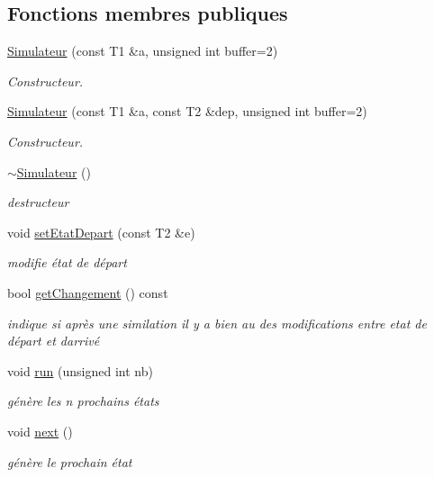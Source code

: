 \subsection*{Fonctions membres publiques}
\begin{DoxyCompactItemize}
\item 
\hyperlink{class_simulateur_afbd90fb92cd6e29e7a2ffe222d0194f8}{Simulateur} (const T1 \&a, unsigned int buffer=2)
\begin{DoxyCompactList}\small\item\em Constructeur. \end{DoxyCompactList}\item 
\hyperlink{class_simulateur_a9c6136e1ffa9ff733ab6b6680a556535}{Simulateur} (const T1 \&a, const T2 \&dep, unsigned int buffer=2)
\begin{DoxyCompactList}\small\item\em Constructeur. \end{DoxyCompactList}\item 
\hyperlink{class_simulateur_a9253bdd8f60dd5f2f2af9ab1e855304c}{$\sim$\+Simulateur} ()
\begin{DoxyCompactList}\small\item\em destructeur \end{DoxyCompactList}\item 
void \hyperlink{class_simulateur_a31296b4599796563a8a6ad1177b76ef4}{set\+Etat\+Depart} (const T2 \&e)
\begin{DoxyCompactList}\small\item\em modifie état de départ \end{DoxyCompactList}\item 
bool \hyperlink{class_simulateur_a6e5511f65b8da6dec66ef9d32e1d1a6a}{get\+Changement} () const 
\begin{DoxyCompactList}\small\item\em indique si après une similation il y a bien au des modifications entre etat de départ et d\textquotesingle{}arrivé \end{DoxyCompactList}\item 
void \hyperlink{class_simulateur_a5a9d0c9de702ee1d71c02126a5a80fad}{run} (unsigned int nb)
\begin{DoxyCompactList}\small\item\em génère les n prochains états \end{DoxyCompactList}\item 
void \hyperlink{class_simulateur_a6043e64df6e41c1d4ae84da540786379}{next} ()
\begin{DoxyCompactList}\small\item\em génère le prochain état \end{DoxyCompactList}\item 

\end{DoxyCompactItemize}
